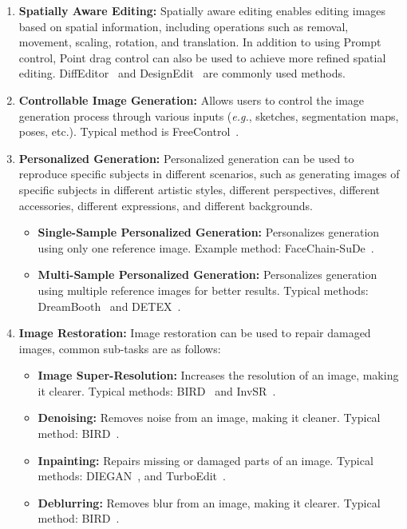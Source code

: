\begin{enumerate}[leftmargin=*,topsep=0pt,itemsep=0pt,align=left]
    \item \textbf{Spatially Aware Editing:} Spatially aware editing enables editing images based on spatial information, including operations such as removal, movement, scaling, rotation, and translation. In addition to using Prompt control, Point drag control can also be used to achieve more refined spatial editing. DiffEditor~\cite{DiffEditor} and DesignEdit~\cite{DesignEdit} are commonly used methods.

    \item \textbf{Controllable Image Generation:} Allows users to control the image generation process through various inputs (\textit{e.g.}, sketches, segmentation maps, poses, etc.). Typical method is FreeControl~\cite{FreeControl}.

    \item \textbf{Personalized Generation:} Personalized generation can be used to reproduce specific subjects in different scenarios, such as generating images of specific subjects in different artistic styles, different perspectives, different accessories, different expressions, and different backgrounds.
        \begin{itemize}[leftmargin=*,topsep=0pt,itemsep=0pt,align=left]
            \item \textbf{Single-Sample Personalized Generation:} Personalizes generation using only one reference image. Example method: FaceChain-SuDe~\cite{FaceChain-SuDe}.
            \item \textbf{Multi-Sample Personalized Generation:} Personalizes generation using multiple reference images for better results. Typical methods: DreamBooth~\cite{DreamBooth} and DETEX~\cite{DETEX}.
        \end{itemize}

    \item \textbf{Image Restoration:} Image restoration can be used to repair damaged images, common sub-tasks are as follows:
    \begin{itemize}[leftmargin=*,topsep=0pt,itemsep=0pt,align=left]
        \item \textbf{Image Super-Resolution:} Increases the resolution of an image, making it clearer. Typical methods: BIRD~\cite{BIRD} and InvSR~\cite{InvSR}.
        \item \textbf{Denoising:} Removes noise from an image, making it cleaner. Typical method: BIRD~\cite{BIRD}.
        \item \textbf{Inpainting:} Repairs missing or damaged parts of an image. Typical methods: DIEGAN~\cite{DIEGAN}, and TurboEdit~\cite{TurboEdit}.
        \item \textbf{Deblurring:} Removes blur from an image, making it clearer. Typical method: BIRD~\cite{BIRD}.
    \end{itemize}


\end{enumerate}
